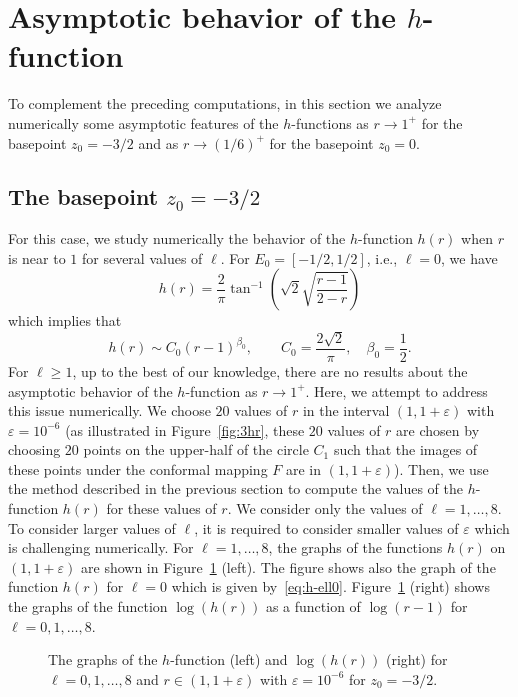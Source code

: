 \section{Asymptotic behavior of the $h$-function}\label{sec:asy}

To complement the preceding computations, in this section we analyze numerically some asymptotic features of the $h$-functions as $r\to1^+$ for the basepoint $z_0=-3/2$ and as $r\to(1/6)^+$ for the basepoint $z_0=0$. 

\subsection{The basepoint $z_0=-3/2$}

For this case, we study numerically the behavior of the $h$-function $h(r)$ when $r$ is near to $1$ for several values of $\ell$. 
For $E_0=[-1/2,1/2]$, i.e., $\ell=0$, we have~\cite{gswc}
\begin{equation}\label{eq:h-ell0}
h(r)=\frac{2}{\pi}\tan^{-1}\left(\sqrt{2}\sqrt{\frac{r-1}{2-r}}\right)
\end{equation}
which implies that
\[
h(r)\sim C_0(r-1)^{\beta_0}, \qquad C_0=\frac{2\sqrt{2}}{\pi}, \quad \beta_0=\frac{1}{2}.
\]
For $\ell\ge1$, up to the best of our knowledge, there are no results about the asymptotic behavior of the $h$-function as $r\to1^+$. Here, we attempt to address this issue numerically.
We choose $20$ values of $r$ in the interval $(1,1+\varepsilon)$ with $\varepsilon=10^{-6}$ (as illustrated in Figure~\ref{fig:3hr}, these $20$ values of $r$ are chosen by choosing $20$ points on the upper-half of the circle $C_1$ such that the images of these points under the conformal mapping $F$ are in  $(1,1+\varepsilon)$). Then, we use the method described in the previous section to compute the values of the $h$-function $h(r)$ for these values of $r$. 
We consider only the values of $\ell=1,\ldots,8$. To consider larger values of $\ell$, it is required to consider smaller values of $\varepsilon$ which is challenging numerically. For $\ell=1,\ldots,8$, the graphs of the functions $h(r)$ on $(1,1+\varepsilon)$ are shown in Figure~\ref{fig:h-asy} (left). The figure shows also the graph of the function $h(r)$ for $\ell=0$ which is given by~\eqref{eq:h-ell0}.
Figure~\ref{fig:h-asy} (right) shows the graphs of the function $\log(h(r))$ as a function of $\log(r-1)$ for $\ell=0,1,\ldots,8$.

\begin{figure}[htb] %
	\centerline{
		\hfill
	}
	\caption{The graphs of the $h$-function (left) and  $\log(h(r))$ (right) for $\ell=0,1,\ldots,8$ and $r\in(1,1+\varepsilon)$ with $\varepsilon=10^{-6}$ for $z_0=-3/2$.}
	\label{fig:h-asy}
\end{figure}

